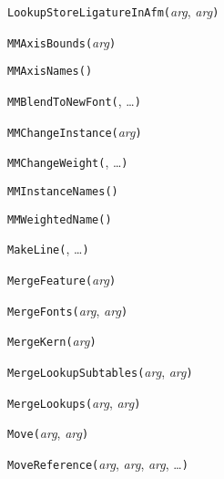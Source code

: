 
\noindent\texttt{LookupStoreLigatureInAfm(}\textit{arg}, \textit{arg}\texttt{)}


\noindent\texttt{MMAxisBounds(}\textit{arg}\texttt{)}


\noindent\texttt{MMAxisNames(}\texttt{)}


\noindent\texttt{MMBlendToNewFont(}, \ldots\texttt{)}


\noindent\texttt{MMChangeInstance(}\textit{arg}\texttt{)}


\noindent\texttt{MMChangeWeight(}, \ldots\texttt{)}


\noindent\texttt{MMInstanceNames(}\texttt{)}


\noindent\texttt{MMWeightedName(}\texttt{)}


\noindent\texttt{MakeLine(}, \ldots\texttt{)}


\noindent\texttt{MergeFeature(}\textit{arg}\texttt{)}


\noindent\texttt{MergeFonts(}\textit{arg}, \textit{arg}\texttt{)}


\noindent\texttt{MergeKern(}\textit{arg}\texttt{)}


\noindent\texttt{MergeLookupSubtables(}\textit{arg}, \textit{arg}\texttt{)}


\noindent\texttt{MergeLookups(}\textit{arg}, \textit{arg}\texttt{)}


\noindent\texttt{Move(}\textit{arg}, \textit{arg}\texttt{)}


\noindent\texttt{MoveReference(}\textit{arg}, \textit{arg}, \textit{arg}, \ldots\texttt{)}

